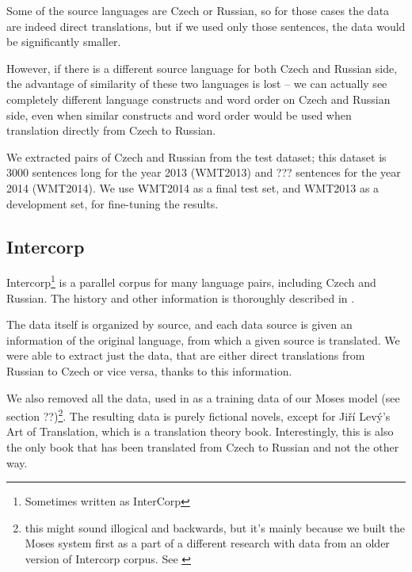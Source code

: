 Some of the source languages are Czech or Russian, so for those cases the data are indeed direct translations, but if we used only those sentences, the data would be significantly smaller.

However, if there is a different source language for both Czech and Russian side, the advantage of similarity of these two languages is lost -- we can actually see completely different language constructs and word order on Czech and Russian side, even when similar constructs and word order would be used when translation directly from Czech to Russian.

We extracted pairs of Czech and Russian from the test dataset; this dataset is 3000 sentences long for the year 2013 (WMT2013) and ??? sentences for the year 2014 (WMT2014). We use WMT2014 as a final test set, and WMT2013 as a development set, for fine-tuning the results.


\subsection{Intercorp}
\label{intercorp_p1}
Intercorp\footnote{Sometimes written as InterCorp} is a parallel corpus for many language pairs, including Czech and Russian. The history and other information is thoroughly described in \cite{intercorp}. 

The data itself is organized by source, and each data source is given an information of the original language, from which a given source is translated. We were able to extract just the data, that are either direct translations from Russian to Czech or vice versa, thanks to this information.

We also removed all the data, used in as a training data of our Moses model (see section ??)\footnote{this might sound illogical and backwards, but it's mainly because we built the Moses system first as a part of a different research with data from an older version of Intercorp corpus. See \cite{mujpaper}}. The resulting data is purely fictional novels, except for Jiří Levý's Art of Translation, which is a translation theory book. Interestingly, this is also the only book that has been translated from Czech to Russian and not the other way.

